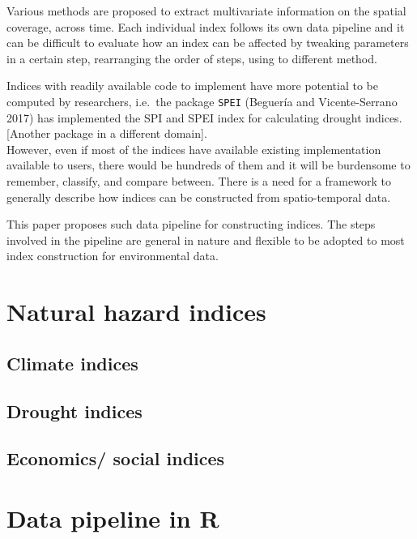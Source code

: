 \documentclass[
]{article}
\begin{document}
Various methods are proposed to extract multivariate information on the
spatial coverage, across time. Each individual index follows its own
data pipeline and it can be difficult to evaluate how an index can be
affected by tweaking parameters in a certain step, rearranging the order
of steps, using to different method.

Indices with readily available code to implement have more potential to
be computed by researchers, i.e.~the package \texttt{SPEI} (Beguería and
Vicente-Serrano 2017) has implemented the SPI and SPEI index for
calculating drought indices. {[}Another package in a different
domain{]}.\\
However, even if most of the indices have available existing
implementation available to users, there would be hundreds of them and
it will be burdensome to remember, classify, and compare between. There
is a need for a framework to generally describe how indices can be
constructed from spatio-temporal data.

This paper proposes such data pipeline for constructing indices. The
steps involved in the pipeline are general in nature and flexible to be
adopted to most index construction for environmental data.

\hypertarget{natural-hazard-indices}{%
\section{Natural hazard indices}\label{natural-hazard-indices}}

\hypertarget{climate-indices}{%
\subsection{Climate indices}\label{climate-indices}}

\hypertarget{drought-indices}{%
\subsection{Drought indices}\label{drought-indices}}

\hypertarget{economics-social-indices}{%
\subsection{Economics/ social indices}\label{economics-social-indices}}

\hypertarget{data-pipeline-in-r}{%
\section{Data pipeline in R}\label{data-pipeline-in-r}}
\end{document}
